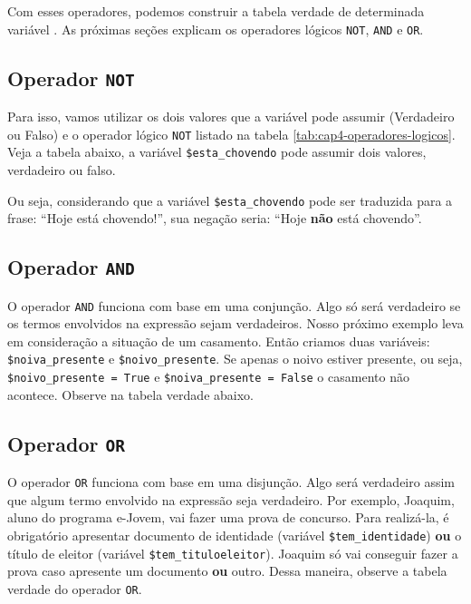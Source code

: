 Com esses operadores, podemos construir a tabela verdade de determinada variável \booleana.
As próximas seções explicam os operadores lógicos \texttt{NOT}, \texttt{AND} e \texttt{OR}.

\subsection{Operador \texttt{NOT}}
\label{operador-not}

Para isso, vamos utilizar os dois valores que a variável pode assumir (Verdadeiro ou Falso)
e o operador lógico \texttt{NOT} listado na tabela \ref{tab:cap4-operadores-logicos}.
Veja a tabela abaixo, a variável \texttt{\$esta\_chovendo} pode assumir dois valores,
verdadeiro ou falso.



Ou seja, considerando que a variável \texttt{\$esta\_chovendo} pode ser traduzida para
a frase: ``Hoje está chovendo!'', sua negação seria: ``Hoje \textbf{não} está chovendo''.

\subsection{Operador \texttt{AND}}
\label{operador-and}

O operador \texttt{AND} funciona com base em uma conjunção. Algo só será verdadeiro
se os termos envolvidos na expressão sejam verdadeiros. Nosso próximo exemplo leva em 
consideração a situação de um casamento. Então criamos duas variáveis: \texttt{\$noiva\_presente} 
e \texttt{\$noivo\_presente}. Se apenas o noivo estiver presente, ou seja,
\texttt{\$noivo\_presente = True} e \texttt{\$noiva\_presente = False} o casamento não acontece. 
Observe na tabela verdade abaixo.



\subsection{Operador \texttt{OR}}
\label{operador-or}

O operador \texttt{OR} funciona com base em uma disjunção. Algo será verdadeiro
assim que algum termo envolvido na expressão seja verdadeiro. Por exemplo, Joaquim,
aluno do programa e-Jovem, vai fazer uma prova de concurso. Para realizá-la, é 
obrigatório apresentar documento de identidade (variável \texttt{\$tem\_identidade})
\textbf{ou} o título de eleitor (variável \texttt{\$tem\_tituloeleitor}).
Joaquim só vai conseguir fazer a prova caso apresente um documento \textbf{ou} outro.
Dessa maneira, observe a tabela verdade do operador \texttt{OR}.

